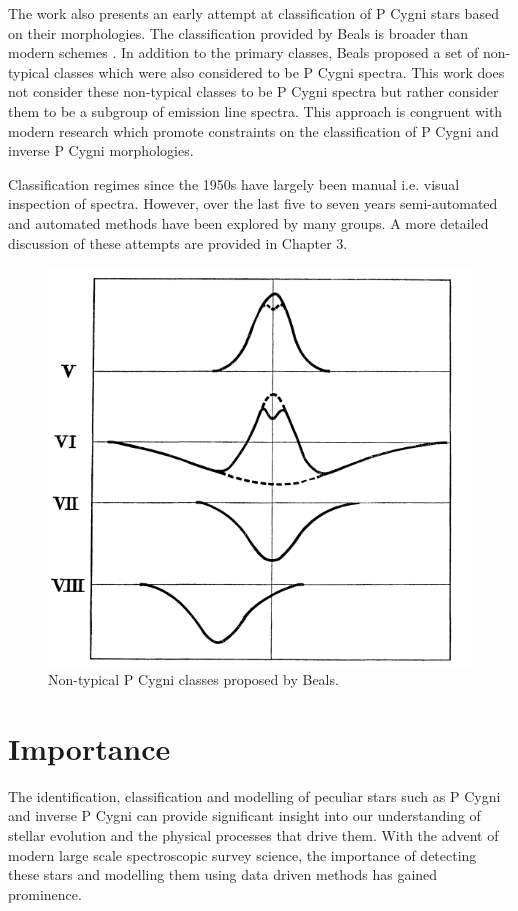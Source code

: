 The work also presents an early attempt at classification of P Cygni stars based on their morphologies. The classification provided by Beals is broader than modern schemes \cite{reipurth1996halpha}. In addition to the primary classes, Beals proposed a set of non-typical classes which were also considered to be P Cygni spectra. This work does not consider these non-typical classes to be P Cygni spectra but rather consider them to be a subgroup of emission line spectra. This approach is congruent with modern research \cite{vcotar2021galah}\cite{zhang2021catalog}\cite{reipurth1996halpha} which promote constraints on the classification of P Cygni and inverse P Cygni morphologies. 

Classification regimes since the 1950s have largely been manual i.e. visual inspection of spectra. However, over the last five to seven years semi-automated and automated methods have been explored by many groups. A more detailed discussion of these attempts are provided in Chapter 3.

\begin{figure}[h]
\centering
\includegraphics[scale=.50]{figures/beals class 2.png}
\caption{Non-typical P Cygni classes proposed by Beals.}
\end{figure}

\section{Importance}
The identification, classification and modelling of peculiar stars such as P Cygni and inverse P Cygni can provide significant insight into our understanding of stellar evolution and the physical processes that drive them. With the advent of modern large scale spectroscopic survey science, the importance of detecting these stars and modelling them using data driven methods has gained prominence.

